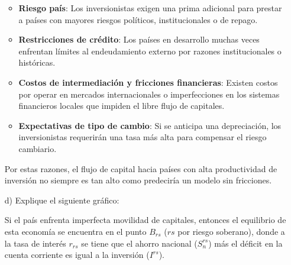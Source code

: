 \documentclass[a4paper]{article}
\begin{document}
\begin{itemize}
\begin{solution}
    \begin{itemize}
        \item \textbf{Riesgo país}: Los inversionistas exigen una prima adicional para prestar a países con mayores riesgos políticos, institucionales o de repago.
        \item \textbf{Restricciones de crédito}: Los países en desarrollo muchas veces enfrentan límites al endeudamiento externo por razones institucionales o históricas.
        \item \textbf{Costos de intermediación y fricciones financieras}: Existen costos por operar en mercados internacionales o imperfecciones en los sistemas financieros locales que impiden el libre flujo de capitales.
        \item \textbf{Expectativas de tipo de cambio}: Si se anticipa una depreciación, los inversionistas requerirán una tasa más alta para compensar el riesgo cambiario.
    \end{itemize}

    Por estas razones, el flujo de capital hacia países con alta productividad de inversión no siempre es tan alto como predeciría un modelo sin fricciones.
    \end{solution}
    \item[d)] Explique el siguiente gráfico:
    \begin{center}
    \end{center}
    \begin{solution}
        Si el país enfrenta imperfecta movilidad de capitales, entonces el equilibrio de esta economía se encuentra en el punto $B_{rs}$ ($rs$ por riesgo soberano), donde a la tasa de interés $r_{rs}$ se tiene que el ahorro nacional ($S_{n}^{rs}$) más el déficit en la cuenta corriente es igual a la inversión ($I^{rs}$).


\end{solution}
\end{itemize}
\end{document}
